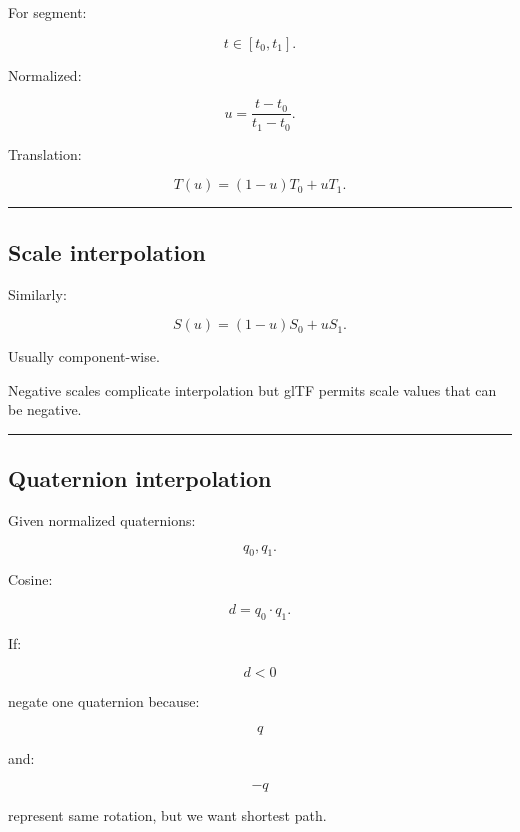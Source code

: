 \hypertarget{04-visual-computing-ii-ch041-translation-interpolation}{}

For segment:

\[
t\in[t_0,t_1].
\]

Normalized:

\[
u=
\frac{t-t_0}{t_1-t_0}.
\]

Translation:

\[
\boxed{
T(u)
=
(1-u)T_0+uT_1.
}
\]

\begin{center}\rule{0.5\linewidth}{0.5pt}\end{center}

\subsection{Scale interpolation}\label{04-visual-computing-ii-ch041-scale-interpolation}

\hypertarget{04-visual-computing-ii-ch041-scale-interpolation}{}

Similarly:

\[
\boxed{
S(u)
=
(1-u)S_0+uS_1.
}
\]

Usually component-wise.

Negative scales complicate interpolation but glTF permits scale values that can be negative.

\begin{center}\rule{0.5\linewidth}{0.5pt}\end{center}

\subsection{Quaternion interpolation}\label{04-visual-computing-ii-ch041-quaternion-interpolation}

\hypertarget{04-visual-computing-ii-ch041-quaternion-interpolation}{}

Given normalized quaternions:

\[
q_0,q_1.
\]

Cosine:

\[
d=q_0\cdot q_1.
\]

If:

\[
d<0
\]

negate one quaternion because:

\[
q
\]

and:

\[
-q
\]

represent same rotation, but we want shortest path.

